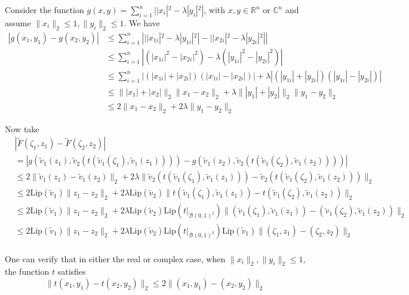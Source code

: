 \documentclass[11pt]{article}
\newcommand{\<}{\langle}
\renewcommand{\>}{\rangle}
\numberwithin{equation}{section}
\newcommand{\lip}{\text{Lip}}
\begin{document}
Consider the function $g(x,y) = \sum_{i=1}^{n}||x_i|^2 - \lambda |y_i|^2|$, with $x,y \in \mathbb{R}^n$ or $\mathbb{C}^n$ and assume $\|x_i\|_2 \leq 1, \|y_i\|_2 \leq 1$. We have
\begin{align*}
|g(x_1,y_1) - g(x_2,y_2)| &\leq \sum_{i=1}^{n} \left| ||x_{1i}|^2 - \lambda |y_{1i}|^2| - ||x_{2i}|^2 - \lambda |y_{2i}|^2| \right|\\
&\leq \sum_{i=1}^{n} |(|x_{1i}|^2 - |x_{2i}|^2) - \lambda (|y_{1i}|^2-|y_{2i}|^2)|\\
&\leq \sum_{i=1}^{n} |(|x_{1i}| + |x_{2i}|)(|x_{1i}| - |x_{2i}|)| + \lambda |(|y_{1i}|+|y_{2i}|)(|y_{1i}|-|y_{2i}|)|\\
&\leq \||x_1|+|x_2|\|_2 \|x_1 - x_2 \|_2 + \lambda \||y_1| +| y_2|\|_2 \|y_1 - y_2 \|_2\\
& \leq 2\|x_1 - x_2 \|_2 + 2\lambda\|y_1 - y_2 \|_2 
\end{align*}

Now take
\begin{align*}
&|\tilde{F}(\zeta_1,z_1) - \tilde{F}(\zeta_2,z_2)| \\
&= |g(\tilde{v}_1 (z_1),\tilde{v}_2 (t(\tilde{v}_1 (\zeta_1),\tilde{v}_1 (z_1)))) - g(\tilde{v}_1 (z_2),\tilde{v}_2 (t(\tilde{v}_1 (\zeta_2),\tilde{v}_1 (z_2))))|\\
&\leq 2\| \tilde{v}_1 (z_1) - \tilde{v}_1 (z_2)  \|_2 + 2\lambda\|   \tilde{v}_2 (t(\tilde{v}_1 (\zeta_1),\tilde{v}_1 (z_1))) - \tilde{v}_2 (t(\tilde{v}_1 (\zeta_2),\tilde{v}_1 (z_2))) \|_2 \\
&\leq 2\lip(\tilde{v}_1)\|z_1-z_2\|_2 + 2\lambda \lip(\tilde{v}_2) \| t(\tilde{v}_1 (\zeta_1),\tilde{v}_1 (z_1)) - t(\tilde{v}_1 (\zeta_2),\tilde{v}_1 (z_2)) \|_2 \\
&\leq 2\lip(\tilde{v}_1)\|z_1-z_2\|_2 + 2\lambda \lip(\tilde{v}_2) \lip(t\vert_{\mathcal{B}(0,1)^2}) \| (\tilde{v}_1 (\zeta_1),\tilde{v}_1 (z_1)) - (\tilde{v}_1 (\zeta_2),\tilde{v}_1 (z_2)) \|_2\\
& \leq 2\lip(\tilde{v}_1)\|z_1-z_2\|_2 + 2\lambda \lip(\tilde{v}_2) \lip(t\vert_{\mathcal{B}(0,1)^2}) \lip(\tilde{v}_1) \| ( \zeta_1,z_1) - (\zeta_2, z_2) \|_2\\
\end{align*}

One can verify that in either the real or complex case, when $\|x_i\|_2,\|y_i\|_2 \leq 1$, the function $t$ satisfies
\[
\|t(x_1,y_1) - t(x_2,y_2)\|_2 \leq 2\| (x_1,y_1)-(x_2,y_2)  \|_2
\]


%
\end{document}
